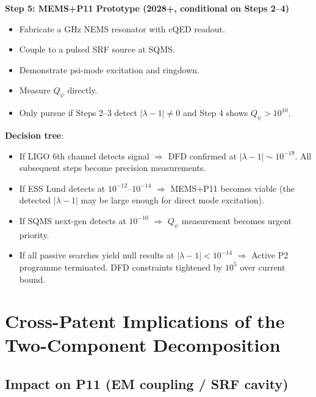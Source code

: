 \documentclass[11pt]{article}
\newcommand{\lam}{\lambda}
\newcommand{\Qpsi}{Q_\psi}
\newcommand{\lbone}{|\lam - 1|}
\theoremstyle{definition}
\theoremstyle{remark}
\begin{document}
\begin{tcolorbox}[colback=blue!5!white, colframe=blue!50!black,
  title=\textbf{W3i6 P2 Optimal Detection Programme}]
\textbf{Step 5: MEMS+P11 Prototype (2028+, conditional on Steps 2--4)}
\begin{itemize}[nosep]
\item Fabricate a GHz NEMS resonator with cQED readout.
\item Couple to a pulsed SRF source at SQMS.
\item Demonstrate psi-mode excitation and ringdown.
\item Measure $\Qpsi$ directly.
\item Only pursue if Steps 2--3 detect $\lbone \neq 0$ and Step 4
  shows $\Qpsi > 10^{10}$.
\end{itemize}

\textbf{Decision tree}:
\begin{itemize}[nosep]
\item If LIGO 6th channel detects signal $\Rightarrow$ DFD confirmed at
  $\lbone \sim 10^{-19}$. All subsequent steps become precision measurements.
\item If ESS Lund detects at $10^{-12}$--$10^{-14}$ $\Rightarrow$
  MEMS+P11 becomes viable (the detected $\lbone$ may be large enough
  for direct mode excitation).
\item If SQMS next-gen detects at $10^{-10}$ $\Rightarrow$ $\Qpsi$
  measurement becomes urgent priority.
\item If all passive searches yield null results at $\lbone < 10^{-14}$
  $\Rightarrow$ Active P2 programme terminated. DFD constraints tightened
  by $10^5$ over current bound.
\end{itemize}
\end{tcolorbox}

\section{Cross-Patent Implications of the Two-Component Decomposition}
\label{sec:cross_patent}

\subsection{Impact on P11 (EM coupling / SRF cavity)}
\label{ssec:P11_impact}
\end{document}
